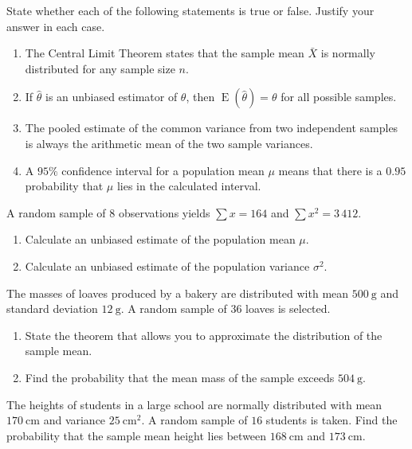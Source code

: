 \documentclass[11pt]{article}
\newcounter{popsec}
\newcounter{popsub}
\newcommand{\courssub}[1]{%
  \stepcounter{popsub}%
  \par\vspace{9pt}\noindent{\popxbold\fontsize{11.5}{13}\selectfont\color{popink}{\color{poporange}\thepopsec.\thepopsub}\hspace{6pt}#1}\par\nopagebreak\vspace{4pt}
}
\begin{document}
\begin{exercice}
State whether each of the following statements is true or false. Justify your answer in each case.
\begin{enumerate}
\item The Central Limit Theorem states that the sample mean $\bar{X}$ is normally distributed for any sample size $n$.
\item If $\hat{\theta}$ is an unbiased estimator of $\theta$, then $\operatorname{E}(\hat{\theta}) = \theta$ for all possible samples.
\item The pooled estimate of the common variance from two independent samples is always the arithmetic mean of the two sample variances.
\item A $95\%$ confidence interval for a population mean $\mu$ means that there is a $0.95$ probability that $\mu$ lies in the calculated interval.
\end{enumerate}
\end{exercice}

\begin{exercice}
A random sample of $8$ observations yields $\sum x = 164$ and $\sum x^2 = 3\,412$.
\begin{enumerate}
\item Calculate an unbiased estimate of the population mean $\mu$.
\item Calculate an unbiased estimate of the population variance $\sigma^2$.
\end{enumerate}
\end{exercice}

\courssub{I practise}

\begin{exercice}
The masses of loaves produced by a bakery are distributed with mean $500\ \mathrm{g}$ and standard deviation $12\ \mathrm{g}$. A random sample of $36$ loaves is selected.
\begin{enumerate}
\item State the theorem that allows you to approximate the distribution of the sample mean.
\item Find the probability that the mean mass of the sample exceeds $504\ \mathrm{g}$.
\end{enumerate}
\end{exercice}

\begin{exercice}
The heights of students in a large school are normally distributed with mean $170\ \mathrm{cm}$ and variance $25\ \mathrm{cm}^2$. A random sample of $16$ students is taken.
Find the probability that the sample mean height lies between $168\ \mathrm{cm}$ and $173\ \mathrm{cm}$.
\end{exercice}
\end{document}
